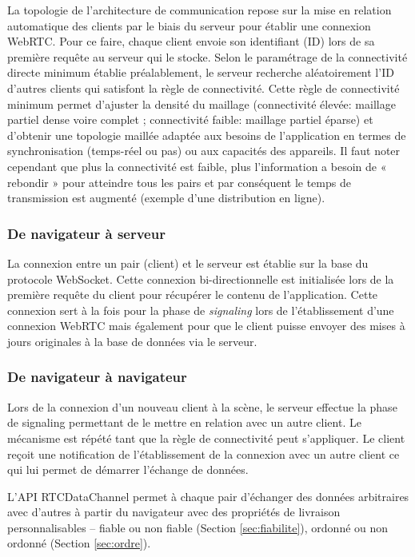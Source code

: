 La topologie de l'architecture de communication repose sur la mise en relation 
automatique des clients par le biais du serveur pour établir une connexion 
\gls{WebRTC}. Pour ce faire, chaque client envoie son identifiant (ID) lors de sa 
première requête au serveur qui le stocke. Selon le paramétrage de la connectivité 
directe minimum établie préalablement, le serveur recherche aléatoirement l'ID 
d'autres clients qui satisfont la règle de connectivité. Cette règle de connectivité 
minimum permet d'ajuster la densité du maillage (connectivité élevée: maillage 
partiel dense voire complet ; connectivité faible: maillage partiel éparse) et 
d'obtenir une topologie maillée adaptée aux besoins de l'application en termes de 
synchronisation (temps-réel ou pas) ou aux capacités des appareils. Il faut noter 
cependant que plus la connectivité est faible, plus l'information a besoin de « 
rebondir » pour atteindre tous les pairs et par conséquent le temps de 
transmission est augmenté (exemple d'une distribution en ligne). 

\subsubsection{De navigateur à serveur}
La connexion entre un pair (client) et le serveur est établie sur la base du protocole 
\gls{WebSocket}. Cette connexion bi-directionnelle est initialisée lors de la 
première requête du client pour récupérer le contenu de l'application. Cette 
connexion sert à la fois pour la phase de \textit{signaling} lors de l'établissement 
d'une connexion WebRTC mais également pour que le client puisse envoyer des 
mises à jours originales à la base de données via le serveur.

\subsubsection{De navigateur à navigateur}
Lors de la connexion d'un nouveau client à la scène, le serveur effectue la phase 
de signaling permettant de le mettre en relation avec un autre client. Le 
mécanisme est répété tant que la règle de connectivité peut s'appliquer. Le client 
reçoit une notification de l'établissement de la connexion avec un autre client ce 
qui lui permet de démarrer l'échange de données.

L'API RTCDataChannel permet à chaque pair d'échanger des données arbitraires 
avec d'autres à partir du navigateur avec des propriétés de livraison 
personnalisables -- fiable ou non fiable (Section \ref{sec:fiabilite}), ordonné ou non 
ordonné (Section \ref{sec:ordre}). 

